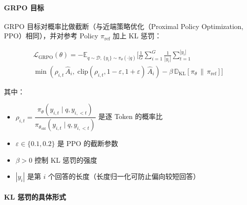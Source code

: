 \paragraph{GRPO 目标}
\label{grpo-objective}

GRPO 目标对概率比做截断（与近端策略优化（Proximal Policy Optimization, PPO）相同），并对参考 Policy $\pi_{\text{ref}}$ 加上 KL 惩罚：

\begin{multline}
\mathcal{L}_{\text{GRPO}}(\theta) = -\mathbb{E}_{q \sim \mathcal{D},\, \{y_i\} \sim \pi_\theta(\cdot|q)} \Bigg[ \frac{1}{G} \sum_{i=1}^{G} \frac{1}{|y_i|} \sum_{t=1}^{|y_i|} \\
\min\!\left( \rho_{i,t}\, \hat{A}_i,\; \text{clip}(\rho_{i,t}, 1{-}\varepsilon, 1{+}\varepsilon)\, \hat{A}_i \right) - \beta\, \mathbb{D}_{\mathrm{KL}}\!\left[\pi_\theta \,\|\, \pi_{\text{ref}}\right] \Bigg]
\label{eq:grpo_full}
\end{multline}

其中：

\begin{itemize}
  \item $\rho_{i,t} = \dfrac{\pi_\theta(y_{i,t} \mid q, y_{i,<t})}{\pi_{\theta_{\text{old}}}(y_{i,t} \mid q, y_{i,<t})}$ 是逐 Token 的概率比
  \item $\varepsilon \in \{0.1, 0.2\}$ 是 PPO 的截断参数
  \item $\beta > 0$ 控制 KL 惩罚的强度
  \item $|y_i|$ 是第 $i$ 个回答的长度（长度归一化可防止偏向较短回答）
\end{itemize}

\paragraph{KL 惩罚的具体形式}
\label{kl-penalty-formulation}

